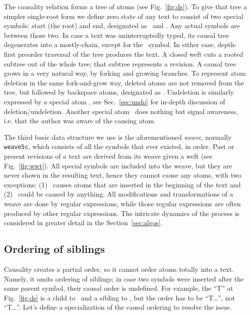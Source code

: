 \documentclass{sig-alternate}
\begin{document}
The causality relation forms a tree of atoms (see Fig.~\ref{fig:ds}).
To give that tree a simpler single-root form we define zero state of any text to consist of two special symbols: start (the root) and end, designated as \aum ~and \eoa.
Any actual symbols are between those two.
In case a text was uninterruptedly typed, its causal tree degenerates into a mostly-chain, except for the \eoa ~symbol.
In either case, depth-first preorder traversal of the tree produces the text.
A closed weft cuts a rooted subtree out of the whole tree; that subtree represents a revision.
A causal tree grows in a very natural way, by forking and growing branches.
To represent atom deletion in the same fork-and-grow way, deleted atoms are not removed from the tree, but followed by backspace atoms, designated as \bsp. 
Undeletion is similarly expressed by a special atom \cnc, see Sec.~\ref{sec:undo} for in-depth discussion of deletion/undeletion.
Another special atom \zero ~does nothing but signal awareness, i.e. that the author was aware of the causing atom.

The third basic data structure we use is the aforementioned \emph{weave}, normally {\tt weave5c}, which consists of all the symbols that ever existed, in order. 
Past or present revisions of a text are derived from its weave given a weft (see Fig.~\ref{fig:wwt}).
All special symbols are included into the weave, but they are never shown in the resulting text, hence they cannot cause any atoms, with two exceptions: (1) \aum ~causes atoms that are inserted in the beginning of the text and (2) \zero ~could be caused by anything.
All modifications and transformations of a weave are done by regular expressions, while those regular expressions are often produced by other regular expressions.
The intricate dynamics of the process is considered in greater detail in the Section~\ref{sec:algos}.


\subsection {Ordering of siblings}  \label{sec:siblord}

Causality creates a partial order, so it cannot order atoms totally into a text.
Namely, it omits ordering of siblings; in case two symbols were inserted after the same parent symbol, their causal order is undefined.
For example, the ``T'' at Fig.~\ref{fig:ds} is a child to \aum ~and a sibling to \eoa, but the order has to be ``\aum T\ldots\eoa'', not ``\aum \eoa T\ldots''.
Let's define a specialization of the causal ordering to resolve the issue.
\end{document}
